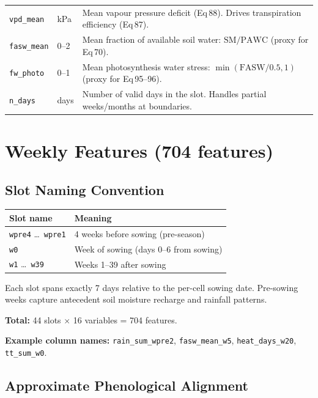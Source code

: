 \documentclass[11pt,a4paper]{article}
\begin{document}
\begin{longtable}{L{3.2cm}L{1.8cm}L{8.2cm}}
\texttt{vpd\_mean} & kPa & Mean vapour pressure deficit (Eq\,88). Drives transpiration efficiency (Eq\,87). \\
\texttt{fasw\_mean} & 0--2 & Mean fraction of available soil water: $\text{SM}/\text{PAWC}$ (proxy for Eq\,70). \\
\texttt{fw\_photo} & 0--1 & Mean photosynthesis water stress: $\min(\text{FASW}/0.5, 1)$ (proxy for Eq\,95--96). \\
\texttt{n\_days} & days & Number of valid days in the slot. Handles partial weeks/months at boundaries. \\
\bottomrule
\end{longtable}

\section{Weekly Features (704 features)}

\subsection{Slot Naming Convention}

\begin{tabular}{ll}
\toprule
\textbf{Slot name} & \textbf{Meaning} \\
\midrule
\texttt{wpre4} \ldots\ \texttt{wpre1} & 4 weeks before sowing (pre-season) \\
\texttt{w0} & Week of sowing (days 0--6 from sowing) \\
\texttt{w1} \ldots\ \texttt{w39} & Weeks 1--39 after sowing \\
\bottomrule
\end{tabular}

\medskip
Each slot spans exactly 7 days relative to the per-cell sowing date. Pre-sowing weeks capture antecedent soil moisture recharge and rainfall patterns.

\textbf{Total:} 44 slots $\times$ 16 variables = 704 features.

\textbf{Example column names:}
\texttt{rain\_sum\_wpre2}, \texttt{fasw\_mean\_w5}, \texttt{heat\_days\_w20}, \texttt{tt\_sum\_w0}.

\subsection{Approximate Phenological Alignment}
\end{document}
